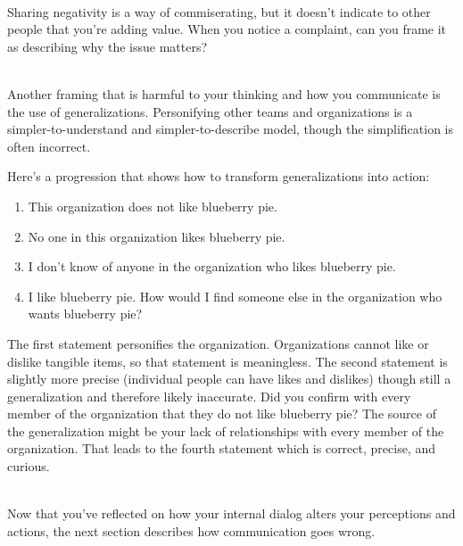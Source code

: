 \ \\
Sharing negativity is a way of commiserating, but it doesn't indicate to other people that you're adding value.  
When you notice a complaint, can you frame it as describing why the issue matters? 

\ \\

Another framing that is harmful to your thinking and how you communicate is the use of generalizations. Personifying other teams and organizations is a simpler-to-understand and simpler-to-describe model, though the simplification is often incorrect. 

Here's a progression that shows how to transform generalizations into action: 
%
%
\begin{enumerate}
    \item This organization does not like blueberry pie.
    \item No one in this organization likes blueberry pie.
    \item I don't know of anyone in the organization who likes blueberry pie.
    \item I like blueberry pie. How would I find someone else in the organization who wants blueberry pie?
\end{enumerate}
The first statement personifies the organization. Organizations cannot like or dislike tangible items, so that statement is meaningless. The second statement is slightly more precise (individual people can have likes and dislikes) though still a generalization and therefore likely inaccurate. Did you confirm with every member of the organization that they do not like blueberry pie? The source of the generalization might be your lack of relationships with every member of the organization. That leads to the fourth statement which is correct, precise, and curious. 

\ \\

Now that you've reflected on how your internal dialog alters your perceptions and actions, the next section describes how communication goes wrong.